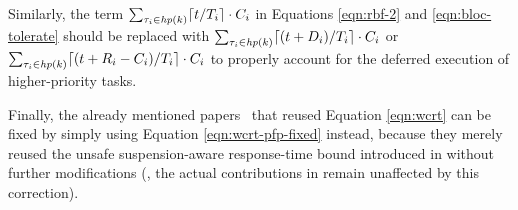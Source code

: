 Similarly, the term $\sum_{\tau_i \in \mathit{hp}(k)} \lceil t / T_i \rceil \cdot C_i$ in Equations \ref{eqn:rbf-2} and \ref{eqn:bloc-tolerate} should be replaced with $\sum_{\tau_i \in \mathit{hp}(k)} \lceil (t+D_i) / T_i \rceil \cdot C_i$ or $\sum_{\tau_i \in \mathit{hp}(k)} \lceil (t+R_i-C_i) / T_i \rceil \cdot C_i$ to properly account for the deferred execution of higher-priority tasks.

Finally, the already mentioned papers~\cite{zeng-2011,bbb-2013,yang-2013,kim-2014,han-2014,carminati-2014,yang-2014} that reused Equation \ref{eqn:wcrt} can be fixed by simply using Equation \ref{eqn:wcrt-pfp-fixed} instead, because they merely reused the unsafe suspension-aware response-time bound introduced in \cite{lakshmanan-2009} without further modifications (\ie, the actual contributions in \cite{zeng-2011,bbb-2013,yang-2013,kim-2014,han-2014,carminati-2014,yang-2014} remain unaffected by this correction).
  
  




  